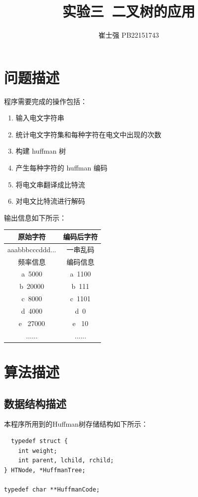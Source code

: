 \documentclass[UTF8]{ctexart}
\title{实验三\ 二叉树的应用}
\author{崔士强 PB22151743}
\date{}
\begin{document}
\maketitle

\section{问题描述}
程序需要完成的操作包括：
\begin{enumerate}
  \item 输入电文字符串
  \item 统计电文字符集和每种字符在电文中出现的次数
  \item 构建 huffman 树
  \item 产生每种字符的 huffman 编码
  \item 将电文串翻译成比特流
  \item 对电文比特流进行解码
\end{enumerate}

输出信息如下所示：
\begin{table}[H]
  \centering
  \begin{tabular}{|c|c|}
    \hline
    原始字符 & 编码后字符 \\
    \hline
    aaabbbcccddd... & 一串乱码 \\
    \hline
    频率信息 & 编码信息 \\
    \hline
    a\ 5000 & a\ 1100 \\
    b\ 20000 & b\ 111 \\
    c\ 8000 & c\ 1101 \\
    d\ 4000 & d\ 0 \\
    e \ 27000 & e \ 10 \\
    ...... & ...... \\
    \hline
  \end{tabular}
\end{table}

\section{算法描述}
\subsection{数据结构描述}
本程序所用到的Huffman树存储结构如下所示：
\begin{lstlisting}
  typedef struct {
    int weight;
    int parent, lchild, rchild;
} HTNode, *HuffmanTree;

typedef char **HuffmanCode;
\end{lstlisting}
\end{document}
